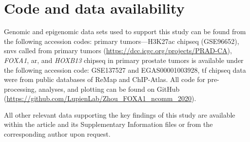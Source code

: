 \section{Code and data availability}

Genomic and epigenomic data sets used to support this study can be found from the following accession codes: primary tumors—H3K27ac \gls{chipseq} (GSE96652), \glspl{snv} called from primary tumors (\url{https://dcc.icgc.org/projects/PRAD-CA}), \emph{FOXA1}, \gls{ar}, and \emph{HOXB13} \gls{chipseq} in primary prostate tumors is available under the following accession code: GSE137527 and EGAS00001003928, \gls{tf} \gls{chipseq} data were from public databases of ReMap and ChIP-Atlas.
All code for pre-processing, analyses, and plotting can be found on GitHub (\url{https://github.com/LupienLab/Zhou_FOXA1_ncomm_2020}).

All other relevant data supporting the key findings of this study are available within the article and its Supplementary Information files or from the corresponding author upon request.
